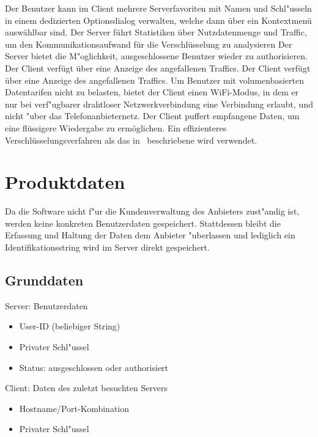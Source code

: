 \documentclass[a4paper,10pt]{scrartcl}
\begin{document}
\begin{usecase}
 {Der Benutzer kann im Client mehrere Serverfavoriten
                  mit Namen und Schl"usseln in einem dedizierten Optionsdialog verwalten,
                  welche dann über ein Kontextmenü auswählbar sind.}
 {Der Server führt Statistiken über Nutzdatenmenge und Traffic,
                  um den Kommunikationsaufwand für die Verschlüsselung zu
                  analysieren}
 {Der Server bietet die M"oglichkeit, ausgeschlossene Benutzer wieder
                  zu authorisieren.}
 {Der Client verfügt über eine Anzeige des angefallenen Traffics.}
 {Der Client verfügt über eine Anzeige des angefallenen Traffics.}
 {Um Benutzer mit volumenbasierten Datentarifen nicht zu belasten,
                  bietet der Client einen WiFi-Modus, in dem er nur bei
                  verf"ugbarer drahtloser Netzwerkverbindung eine Verbindung erlaubt,
                  und nicht "uber das Telefonanbieternetz.}
 {Der Client puffert empfangene Daten, um eine flüssigere
                  Wiedergabe zu ermöglichen.}
 {Ein effizienteres Verschlüsselungsverfahren als das in~\cite{Naor00} beschriebene
                  wird verwendet.}
\end{usecase}

\section{Produktdaten}
Da die Software nicht f"ur die Kundenverwaltung des Anbieters zust"andig ist, werden keine
konkreten Benutzerdaten gespeichert. Stattdessen bleibt die Erfassung und Haltung der Daten
dem Anbieter "uberlassen und lediglich ein Identifikationsstring wird im Server direkt gespeichert.

\subsection{Grunddaten}
\begin{usecase}
 {Server: Benutzerdaten
   \begin{itemize}
   \item User-ID (beliebiger String)
   \item Privater Schl"ussel
   \item Status: ausgeschlossen oder authorisiert
   \end{itemize}
}
 {Client: Daten des zuletzt besuchten Servers
   \begin{itemize}
   \item Hostname/Port-Kombination
   \item Privater Schl"ussel
   \end{itemize}
}
\end{usecase}
\end{document}
